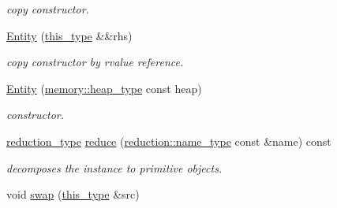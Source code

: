 \begin{DoxyCompactItemize}
\begin{DoxyCompactList}\small\item\em copy constructor. \end{DoxyCompactList}\item 
\hypertarget{classhryky_1_1http_1_1header_1_1accept_1_1_entity_abd359a65a8d10c1c7e0fac28d4b3e1b0}{\hyperlink{classhryky_1_1http_1_1header_1_1accept_1_1_entity_abd359a65a8d10c1c7e0fac28d4b3e1b0}{Entity} (\hyperlink{classhryky_1_1http_1_1header_1_1accept_1_1_entity_a09779fe531e8017b8d88ef779e186488}{this\-\_\-type} \&\&rhs)}\label{classhryky_1_1http_1_1header_1_1accept_1_1_entity_abd359a65a8d10c1c7e0fac28d4b3e1b0}

\begin{DoxyCompactList}\small\item\em copy constructor by rvalue reference. \end{DoxyCompactList}\item 
\hypertarget{classhryky_1_1http_1_1header_1_1accept_1_1_entity_a3d26d2a64dfba5c833cdf6a4aa31017e}{\hyperlink{classhryky_1_1http_1_1header_1_1accept_1_1_entity_a3d26d2a64dfba5c833cdf6a4aa31017e}{Entity} (\hyperlink{classhryky_1_1memory_1_1heap_1_1_base}{memory\-::heap\-\_\-type} const heap)}\label{classhryky_1_1http_1_1header_1_1accept_1_1_entity_a3d26d2a64dfba5c833cdf6a4aa31017e}

\begin{DoxyCompactList}\small\item\em constructor. \end{DoxyCompactList}\item 
\hypertarget{classhryky_1_1http_1_1header_1_1accept_1_1_entity_a19d582b87cd5f95b93d03f633abcf8a1}{\hyperlink{namespacehryky_a343a9a4c36a586be5c2693156200eadc}{reduction\-\_\-type} \hyperlink{classhryky_1_1http_1_1header_1_1accept_1_1_entity_a19d582b87cd5f95b93d03f633abcf8a1}{reduce} (\hyperlink{namespacehryky_1_1reduction_ac686c30a4c8d196bbd0f05629a6b921f}{reduction\-::name\-\_\-type} const \&name) const }\label{classhryky_1_1http_1_1header_1_1accept_1_1_entity_a19d582b87cd5f95b93d03f633abcf8a1}

\begin{DoxyCompactList}\small\item\em decomposes the instance to primitive objects. \end{DoxyCompactList}\item 
\hypertarget{classhryky_1_1http_1_1header_1_1accept_1_1_entity_a13f04861d9b3ca3f8c4fb6859c4bc697}{void \hyperlink{classhryky_1_1http_1_1header_1_1accept_1_1_entity_a13f04861d9b3ca3f8c4fb6859c4bc697}{swap} (\hyperlink{classhryky_1_1http_1_1header_1_1accept_1_1_entity_a09779fe531e8017b8d88ef779e186488}{this\-\_\-type} \&src)}\label{classhryky_1_1http_1_1header_1_1accept_1_1_entity_a13f04861d9b3ca3f8c4fb6859c4bc697}


\end{DoxyCompactItemize}
